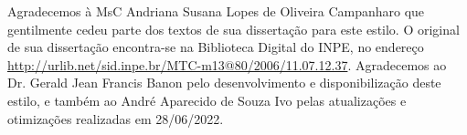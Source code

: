 
\begin{agradecimentos}  %


Agradecemos à MsC Andriana Susana Lopes de Oliveira Campanharo que gentilmente cedeu 
parte dos textos de sua dissertação para este estilo. O original de sua dissertação
encontra-se na Biblioteca Digital do INPE, no endereço \url{http://urlib.net/sid.inpe.br/MTC-m13@80/2006/11.07.12.37}.
Agradecemos ao Dr. Gerald Jean Francis Banon pelo desenvolvimento e disponibilização deste estilo, e também ao André Aparecido de Souza Ivo pelas atualizações e otimizações realizadas em 28/06/2022.

\end{agradecimentos}
